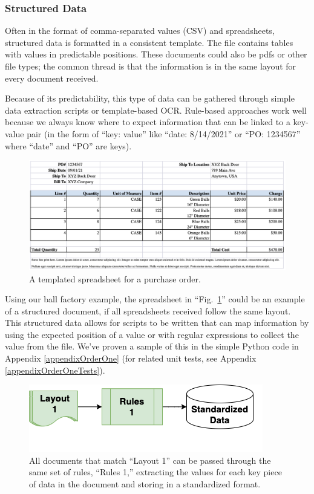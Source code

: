 \documentclass[conference]{IEEEtran}
\begin{document}
\subsubsection{Structured Data}
Often in the format of comma-separated values (CSV) and spreadsheets, structured data is formatted in a consistent template. The file contains tables with values in predictable positions. These documents could also be pdfs or other file types; the common thread is that the information is in the same layout for every document received.

Because of its predictability, this type of data can be gathered through simple data extraction scripts or template-based OCR. Rule-based approaches work well because we always know where to expect information that can be linked to a key-value pair (in the form of ``key: value'' like ``date: 8/14/2021'' or ``PO: 1234567'' where ``date'' and ``PO'' are keys).

\begin{figure}[ht]
\centerline{\includegraphics[width=\columnwidth]{Spreadsheet1.png}}
\caption{A templated spreadsheet for a purchase order.}
\label{figSpreadsheet1}
\end{figure}

Using our ball factory example, the spreadsheet in ``Fig.~\ref{figSpreadsheet1}'' could be an example of a structured document, if all spreadsheets received follow the same layout. This structured data allows for scripts to be written that can map information by using the expected position of a value or with regular expressions to collect the value from the file. We've proven a sample of this in the simple Python code in Appendix \ref{appendixOrderOne} (for related unit tests, see Appendix \ref{appendixOrderOneTests}).

\begin{figure}[ht]
\centerline{\includegraphics[width=\columnwidth]{RulesFlow1.png}}
\caption{All documents that match ``Layout 1'' can be passed through the same set of rules, ``Rules 1,'' extracting the values for each key piece of data in the document and storing in a standardized format.}
\label{figRulesFlow1}
\end{figure}
\end{document}

